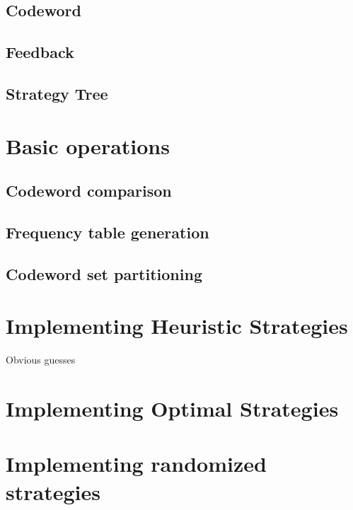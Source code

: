 \subsection{Codeword}

\subsection{Feedback}

\subsection{Strategy Tree}

\section{Basic operations}

\subsection{Codeword comparison}

\subsection{Frequency table generation}

\subsection{Codeword set partitioning}

\section{Implementing Heuristic Strategies}

 Obvious guesses
 
\section{Implementing Optimal Strategies}
 
\section{Implementing randomized strategies}
